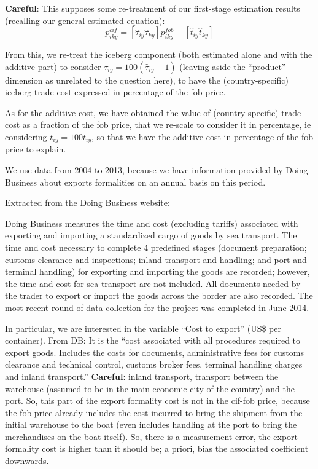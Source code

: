\documentclass[a4paper,11pt]{article}
\begin{document}
\textbf{Careful}: This supposes some re-treatment of our first-stage estimation results (recalling our general estimated equation):
$$p_{iky}^{cif} = \left[\widehat{\tau}_{iy}\widehat{\tau}_{ky}\right] p^{fob}_{iky} +  \left[\widehat{t}_{iy}\widehat{t}_{ky}\right]$$

From this, we re-treat the iceberg component (both estimated alone and with the additive part) to consider $\tau_{iy} =  100(\widehat{\tau}_{iy}-1)$ (leaving aside the ``product'' dimension as unrelated to the question here), to have the (country-specific) iceberg trade cost expressed in percentage of the fob price.

As for the additive cost, we have obtained the value of (country-specific) trade cost as a fraction of the fob price, that we re-scale to consider it in percentage, ie considering $t_{iy} =  100 t_{iy}$, so that we have the additive cost in percentage of the fob price to explain. \medskip

We use data from 2004 to 2013, because we have information provided by Doing Business about exports formalities on an annual basis on this period.\bigskip

Extracted from the Doing Business website:

Doing Business measures the time and cost (excluding tariffs) associated with exporting and importing a standardized cargo of goods by sea transport. The time and cost necessary to complete 4 predefined stages (document preparation; customs clearance and inspections; inland transport and handling; and port and terminal handling) for exporting and importing the goods are recorded; however, the time and cost for sea transport are not included. All documents needed by the trader to export or import the goods across the border are also recorded. The most recent round of data collection for the project was completed in June 2014.

In particular, we are interested in the variable ``Cost to export'' (US\$ per container). From DB: It is the ``cost associated with all procedures required to export goods. Includes the costs for documents, administrative fees for customs clearance and technical control, customs broker fees, terminal handling charges and inland transport.'' \textbf{Careful}: inland transport, transport between the warehouse (assumed to be in the main economic city of the country) and the port. So, this part of the export formality cost is not in the cif-fob price, because the fob price already includes the cost incurred to bring the shipment from the initial warehouse to the boat (even includes handling at the port to bring the merchandises on the boat itself). So, there is a measurement error, the export formality cost is higher than it should be; a priori, bias the associated coefficient downwards.
\end{document}
